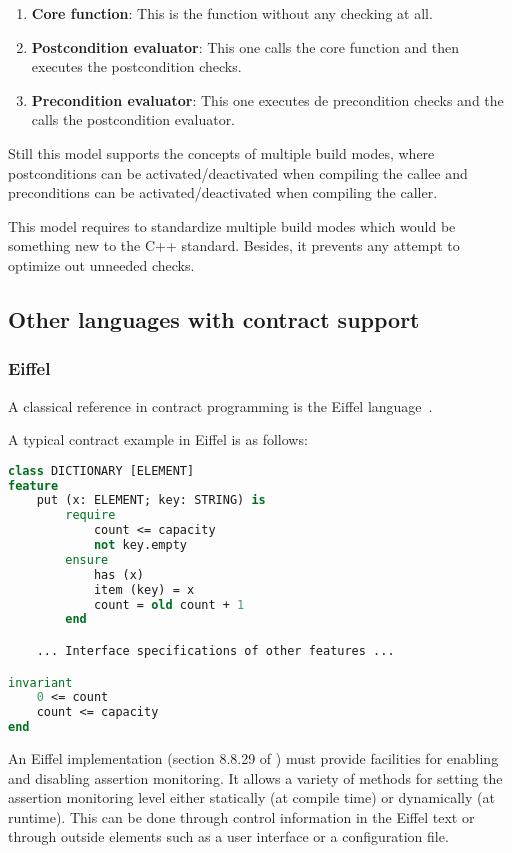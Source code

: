 \begin{enumerate}

\item \textbf{Core function}: This is the function without any checking at all.

\item \textbf{Postcondition evaluator}: This one calls the core function and
then executes the postcondition checks.

\item \textbf{Precondition evaluator}: This one executes de precondition checks
and the calls the postcondition evaluator.

\end{enumerate}

Still this model supports the concepts of multiple build modes, where
postconditions can be activated/deactivated when compiling the callee and
preconditions can be activated/deactivated when compiling the caller.

This model requires to standardize multiple build modes which would be something
new to the C++ standard. Besides, it prevents any attempt to optimize out
unneeded checks.



\subsection{Other languages with contract support}

\subsubsection{Eiffel}

A classical reference in contract programming is the Eiffel
language~\cite{iso-eiffel,ecma-eiffel}.

A typical contract example in Eiffel is as follows:

\begin{lstlisting}[language=Eiffel]
class DICTIONARY [ELEMENT]
feature
	put (x: ELEMENT; key: STRING) is
		require
			count <= capacity
			not key.empty 
		ensure
			has (x)
			item (key) = x
			count = old count + 1
		end

	... Interface specifications of other features ...

invariant
	0 <= count
	count <= capacity
end
\end{lstlisting}

An Eiffel implementation (section 8.8.29 of \cite{ecma-eiffel}) must provide
facilities for enabling and disabling assertion monitoring. It allows a variety
of methods for setting the assertion monitoring level either statically (at
compile time) or dynamically (at runtime). This can be done through control
information in the Eiffel text or through outside elements such as a user
interface or a configuration file.


